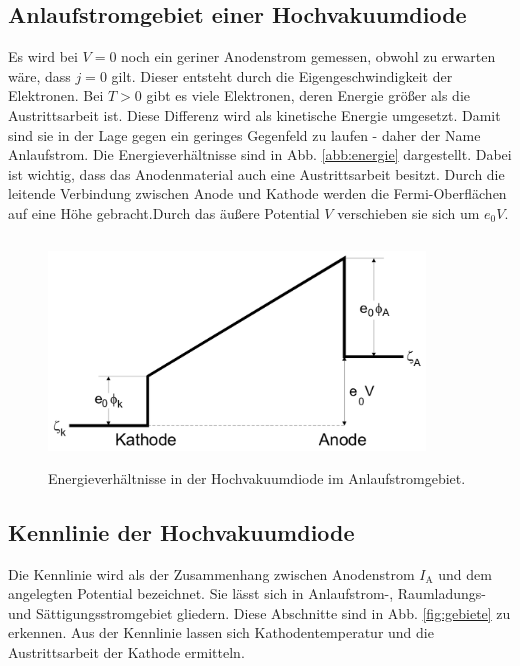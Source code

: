 \subsection{Anlaufstromgebiet einer Hochvakuumdiode}

Es wird bei $V = 0$ noch ein geriner Anodenstrom gemessen, 
obwohl zu erwarten wäre, dass $j = 0$ gilt. Dieser entsteht 
durch die Eigengeschwindigkeit der Elektronen. Bei $T > 0$ 
gibt es viele Elektronen, deren Energie größer als die 
Austrittsarbeit ist. Diese Differenz wird als kinetische 
Energie umgesetzt. Damit sind sie in der Lage gegen ein 
geringes Gegenfeld zu laufen - daher der Name Anlaufstrom. 
Die Energieverhältnisse sind in Abb. \ref{abb:energie}
dargestellt. Dabei ist wichtig, dass das Anodenmaterial auch 
eine Austrittsarbeit besitzt. Durch die leitende Verbindung 
zwischen Anode und Kathode werden die Fermi-Oberflächen auf 
eine Höhe gebracht.Durch das äußere Potential $V$ 
verschieben sie sich um $e_0 V$.

\begin{figure}
    \centering
    \includegraphics[width=10cm, height=6cm]{build/energie.png}
    \caption{Energieverhältnisse in der Hochvakuumdiode im Anlaufstromgebiet. \cite{V504}}
    \label{fig:energie}
\end{figure}

\subsection{Kennlinie der Hochvakuumdiode}

Die Kennlinie wird als der Zusammenhang zwischen Anodenstrom 
$I_\text{A}$ und dem angelegten Potential bezeichnet. 
Sie lässt sich in Anlaufstrom-, Raumladungs- und 
Sättigungsstromgebiet gliedern. 
Diese Abschnitte sind in Abb. \ref{fig:gebiete} zu erkennen.
Aus der Kennlinie lassen sich Kathodentemperatur und die 
Austrittsarbeit der Kathode ermitteln.

